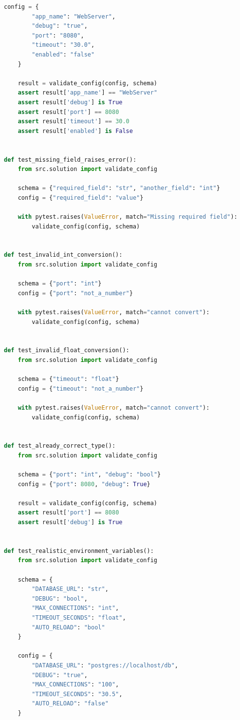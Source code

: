 \begin{appendices}
\begin{lstlisting}[language=Python]
    config = {
        "app_name": "WebServer",
        "debug": "true",
        "port": "8080",
        "timeout": "30.0",
        "enabled": "false"
    }
    
    result = validate_config(config, schema)
    assert result['app_name'] == "WebServer"
    assert result['debug'] is True
    assert result['port'] == 8080
    assert result['timeout'] == 30.0
    assert result['enabled'] is False


def test_missing_field_raises_error():
    from src.solution import validate_config
    
    schema = {"required_field": "str", "another_field": "int"}
    config = {"required_field": "value"}
    
    with pytest.raises(ValueError, match="Missing required field"):
        validate_config(config, schema)


def test_invalid_int_conversion():
    from src.solution import validate_config
    
    schema = {"port": "int"}
    config = {"port": "not_a_number"}
    
    with pytest.raises(ValueError, match="cannot convert"):
        validate_config(config, schema)


def test_invalid_float_conversion():
    from src.solution import validate_config
    
    schema = {"timeout": "float"}
    config = {"timeout": "not_a_number"}
    
    with pytest.raises(ValueError, match="cannot convert"):
        validate_config(config, schema)


def test_already_correct_type():
    from src.solution import validate_config
    
    schema = {"port": "int", "debug": "bool"}
    config = {"port": 8080, "debug": True}
    
    result = validate_config(config, schema)
    assert result['port'] == 8080
    assert result['debug'] is True


def test_realistic_environment_variables():
    from src.solution import validate_config
    
    schema = {
        "DATABASE_URL": "str",
        "DEBUG": "bool",
        "MAX_CONNECTIONS": "int",
        "TIMEOUT_SECONDS": "float",
        "AUTO_RELOAD": "bool"
    }
    
    config = {
        "DATABASE_URL": "postgres://localhost/db",
        "DEBUG": "true",
        "MAX_CONNECTIONS": "100",
        "TIMEOUT_SECONDS": "30.5",
        "AUTO_RELOAD": "false"
    }
    

\end{lstlisting}
\end{appendices}
